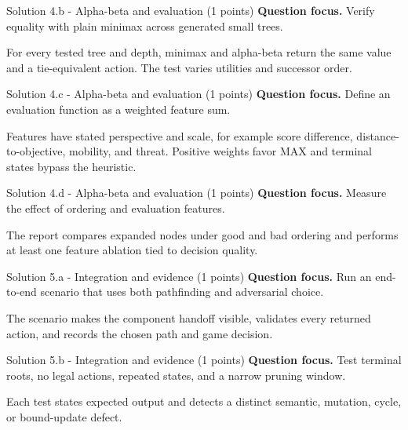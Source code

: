 \documentclass[aspectratio=169,11pt]{beamer}
\begin{document}
\begin{frame}{Solution 4.b - Alpha-beta and evaluation (1 points)}
\small
\textbf{Question focus.} Verify equality with plain minimax across generated small trees.

\vspace{0.25cm}
\answerlabel For every tested tree and depth, minimax and alpha-beta return the same value and a tie-equivalent action. The test varies utilities and successor order.
\end{frame}

\begin{frame}{Solution 4.c - Alpha-beta and evaluation (1 points)}
\small
\textbf{Question focus.} Define an evaluation function as a weighted feature sum.

\vspace{0.25cm}
\answerlabel Features have stated perspective and scale, for example score difference, distance-to-objective, mobility, and threat. Positive weights favor MAX and terminal states bypass the heuristic.
\end{frame}

\begin{frame}{Solution 4.d - Alpha-beta and evaluation (1 points)}
\small
\textbf{Question focus.} Measure the effect of ordering and evaluation features.

\vspace{0.25cm}
\answerlabel The report compares expanded nodes under good and bad ordering and performs at least one feature ablation tied to decision quality.
\end{frame}

\begin{frame}{Solution 5.a - Integration and evidence (1 points)}
\small
\textbf{Question focus.} Run an end-to-end scenario that uses both pathfinding and adversarial choice.

\vspace{0.25cm}
\answerlabel The scenario makes the component handoff visible, validates every returned action, and records the chosen path and game decision.
\end{frame}

\begin{frame}{Solution 5.b - Integration and evidence (1 points)}
\small
\textbf{Question focus.} Test terminal roots, no legal actions, repeated states, and a narrow pruning window.

\vspace{0.25cm}
\answerlabel Each test states expected output and detects a distinct semantic, mutation, cycle, or bound-update defect.
\end{frame}
\end{document}
